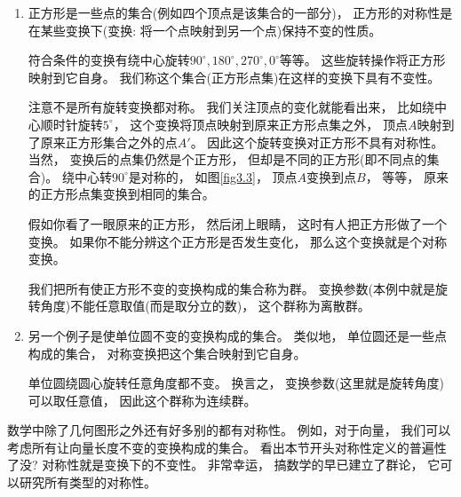 \begin{enumerate}
	\item 正方形是一些点的集合(例如四个顶点是该集合的一部分)， 正方形的对称性是在某些变换下(变换: 将一个点映射到另一个点)保持不变的性质。
		
	符合条件的变换有绕中心旋转$90^\circ, 180^\circ, 270^\circ, 0^\circ$等等。 这些旋转操作将正方形映射到它自身。 我们称这个集合(正方形点集)在这样的变换下具有不变性。
	
	
	
	注意不是所有旋转变换都对称。 我们关注顶点的变化就能看出来， 比如绕中心顺时针旋转$5^\circ$， 这个变换将顶点映射到原来正方形点集之外， 顶点$A$映射到了原来正方形集合之外的点$A'$。 因此这个旋转变换对正方形不具有对称性。 当然， 变换后的点集仍然是个正方形， 但却是不同的正方形(即不同点的集合)。 绕中心转$90^\circ$是对称的， 如图\ref{fig3.3}， 顶点$A$变换到点$B$， 等等， 原来的正方形点集变换到相同的集合。
	
	{
	}
	
	假如你看了一眼原来的正方形， 然后闭上眼睛， 这时有人把正方形做了一个变换。 如果你不能分辨这个正方形是否发生变化， 那么这个变换就是个对称变换。
	
	我们把所有使正方形不变的变换构成的集合称为群。 变换参数(本例中就是旋转角度)不能任意取值(而是取分立的数)， 这个群称为离散群。
	
	\item 另一个例子是使单位圆不变的变换构成的集合。 类似地， 单位圆还是一些点构成的集合， 对称变换把这个集合映射到它自身。
	
	单位圆绕圆心旋转任意角度都不变。 换言之， 变换参数(这里就是旋转角度)可以取任意值， 因此这个群称为连续群。
\end{enumerate}

数学中除了几何图形之外还有好多别的都有对称性。 例如，对于向量， 我们可以考虑所有让向量长度不变的变换构成的集合。 看出本节开头对称性定义的普遍性了没? 对称性就是变换下的不变性。 非常幸运， 搞数学的早已建立了群论， 它可以研究所有类型的对称性。

